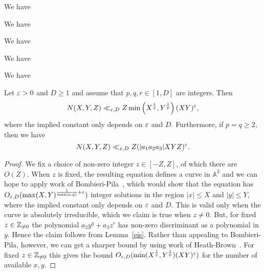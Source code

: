 \begin{theorem} \label{thm:BombieriPilaforDet}
We have
\end{theorem}

\begin{theorem} \label{thm:HeathBrownpadicDet}
  We have
\end{theorem}

\begin{theorem} \label{thm:HeathBrownQuadraticForms}
  We have
\end{theorem}

\begin{theorem} \label{thm:BombierSchmidtforThueEqs}
  We have
\end{theorem}

\begin{lemma} \label{lem:omegaUpperBound}
We have
\end{lemma}

\begin{lemma}\label{lem:MixedDetMethods}
Let $\varepsilon>0$ and $D\geq 1$ and
assume that $p,q,r\in [1,D]$ are integers. Then
\[
N(X,Y,Z)\ll_{\varepsilon,D} Z \min\left(X^{\frac{1}{q}}, Y^{\frac{1}{p}} \right) (XY)^\varepsilon,
\]
where the implied constant only depends on $\varepsilon$ and $D$. Furthermore,
if $p=q\geq 2$,
then we have
\[
N(X,Y,Z)\ll_{\varepsilon,D} Z (|a_1a_2a_3|XYZ)^\varepsilon.
\]
\end{lemma}


\begin{proof}
We fix a choice of non-zero integer $z\in [-Z,Z]$, of which there are $O(Z)$. When $z$ is fixed, the resulting equation defines a curve in $\mathbb{A}^2$ and we can hope to apply work of Bombieri-Pila~\cite[Theorem~4]{bp}, which would show that the equation has $O_{\varepsilon,D}(\max(X,Y)^{\frac{1}{\max(p,q)}+\varepsilon})$ integer solutions in the region $|x|\leq X$ and $|y|\leq Y$, where the implied constant only depends on $\varepsilon$ and $D$. This is valid only when
the curve is absolutely irreducible, which we claim is true when $z\neq 0$. But, for fixed $z\in \mathbb{Z}_{\neq 0}$ the
polynomial $a_2y^q+a_3z^r$ has non-zero discriminant as a polynomial in $y$. Hence the claim follows from Lemma~\ref{eis}. Rather than appealing to Bombieri-Pila, however, we can get a sharper bound by using work of
 Heath-Brown~\cite[Theorem 15]{cime}. For fixed $z\in \mathbb{Z}_{\neq 0}$ this gives the bound
 $O_{\varepsilon,D}(\min(X^{\frac{1}{q}},Y^{\frac{1}{p}})(XY)^\varepsilon)$ for the number of available $x,y$.
\end{proof}

